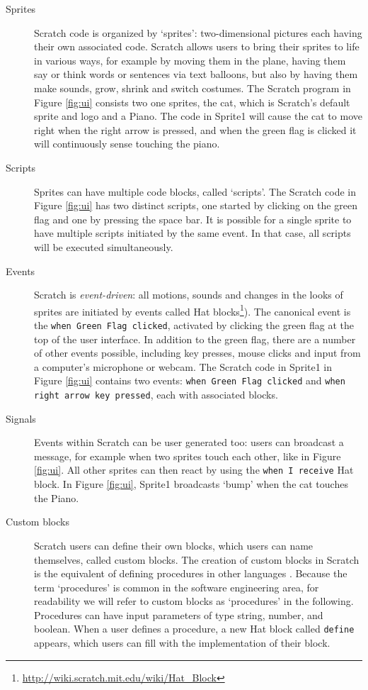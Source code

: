 \documentclass{sig-alternate}
\begin{document}
\begin{description}
	\item [Sprites] Scratch code is organized by `sprites': two-dimensional pictures each having their own associated code. Scratch allows users to bring their sprites to life in various ways, for example by moving them in the plane, having them say or think words or sentences via text balloons, but also by having them make sounds, grow, shrink and switch costumes. The Scratch program in Figure \ref{fig:ui} consists two one sprites, the cat, which is Scratch's default sprite and logo and a Piano. The code in Sprite1 will cause the cat to move right when the right arrow is pressed, and when the green flag is clicked it will continuously sense touching the piano.
	\item [Scripts]Sprites can have multiple code blocks, called `scripts'. The Scratch code in Figure \ref{fig:ui} has two distinct scripts, one started by clicking on the green flag and one by pressing the space bar. It is possible for a single sprite to have multiple scripts initiated by the same event. In that case, all scripts will be executed simultaneously.
	\item [Events] Scratch is \emph{event-driven}: all motions, sounds and changes in the looks of sprites are initiated by events called Hat blocks\footnote{\url{http://wiki.scratch.mit.edu/wiki/Hat_Block}}). The canonical event is the \texttt{when Green Flag clicked}, activated by clicking the green flag at the top of the user interface. In addition to the green flag, there are a number of other events possible, including key presses, mouse clicks and input from a computer's microphone or webcam. The Scratch code in Sprite1 in Figure \ref{fig:ui} contains two events: \texttt{when Green Flag clicked} and \texttt{when right arrow key pressed}, each with associated blocks.
	\item [Signals] Events within Scratch can be user generated too: users can broadcast a message, for example when two sprites touch each other, like in Figure \ref{fig:ui}. All other sprites can then react by using the \texttt{when I receive} Hat block. In Figure \ref{fig:ui}, Sprite1 broadcasts `bump' when the cat touches the Piano. 
	\item[Custom blocks] Scratch users can define their own blocks, which users can name themselves, called custom blocks. The creation of custom blocks in Scratch is the equivalent of defining procedures in other languages \cite{moreno_automatic_2014}. Because the term `procedures' is common in the software engineering area, for readability we will refer to custom blocks as `procedures' in the following. Procedures can have input parameters of type string, number, and boolean. When a user defines a procedure, a new Hat block called \texttt{define} appears, which users can fill with the implementation of their block.
\end{description}
\end{document}
